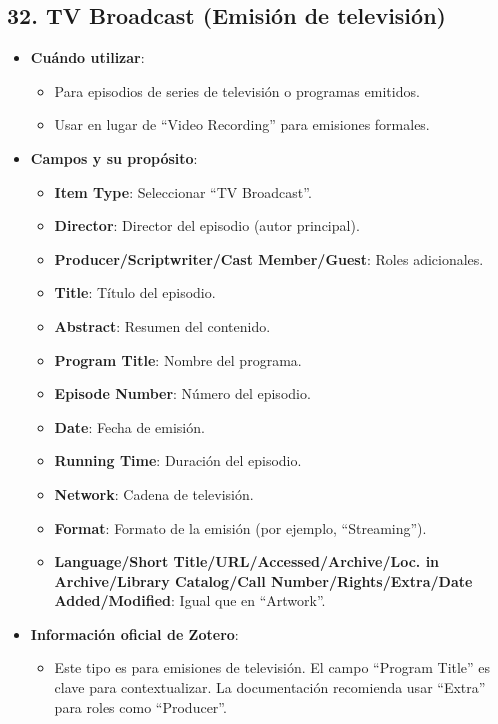 \documentclass[
  jou,
  floatsintext,
  longtable,
  a4paper,
  nolmodern,
  notxfonts,
  notimes,
  colorlinks=true,linkcolor=blue,citecolor=blue,urlcolor=blue]{apa7}
\providecommand{\tightlist}{%
  \setlength{\itemsep}{0pt}\setlength{\parskip}{0pt}}
\begin{document}
\subsection{32. TV Broadcast (Emisión de
televisión)}\label{tv-broadcast-emisiuxf3n-de-televisiuxf3n}

\begin{itemize}
\tightlist
\item
  \textbf{Cuándo utilizar}:

  \begin{itemize}
  \tightlist
  \item
    Para episodios de series de televisión o programas emitidos.
  \item
    Usar en lugar de ``Video Recording'' para emisiones formales.
  \end{itemize}
\item
  \textbf{Campos y su propósito}:

  \begin{itemize}
  \tightlist
  \item
    \textbf{Item Type}: Seleccionar ``TV Broadcast''.
  \item
    \textbf{Director}: Director del episodio (autor principal).
  \item
    \textbf{Producer/Scriptwriter/Cast Member/Guest}: Roles adicionales.
  \item
    \textbf{Title}: Título del episodio.
  \item
    \textbf{Abstract}: Resumen del contenido.
  \item
    \textbf{Program Title}: Nombre del programa.
  \item
    \textbf{Episode Number}: Número del episodio.
  \item
    \textbf{Date}: Fecha de emisión.
  \item
    \textbf{Running Time}: Duración del episodio.
  \item
    \textbf{Network}: Cadena de televisión.
  \item
    \textbf{Format}: Formato de la emisión (por ejemplo, ``Streaming'').
  \item
    \textbf{Language/Short Title/URL/Accessed/Archive/Loc. in
    Archive/Library Catalog/Call Number/Rights/Extra/Date
    Added/Modified}: Igual que en ``Artwork''.
  \end{itemize}
\item
  \textbf{Información oficial de Zotero}:

  \begin{itemize}
  \tightlist
  \item
    Este tipo es para emisiones de televisión. El campo ``Program
    Title'' es clave para contextualizar. La documentación recomienda
    usar ``Extra'' para roles como ``Producer''.
  \end{itemize}
\end{itemize}
\end{document}
